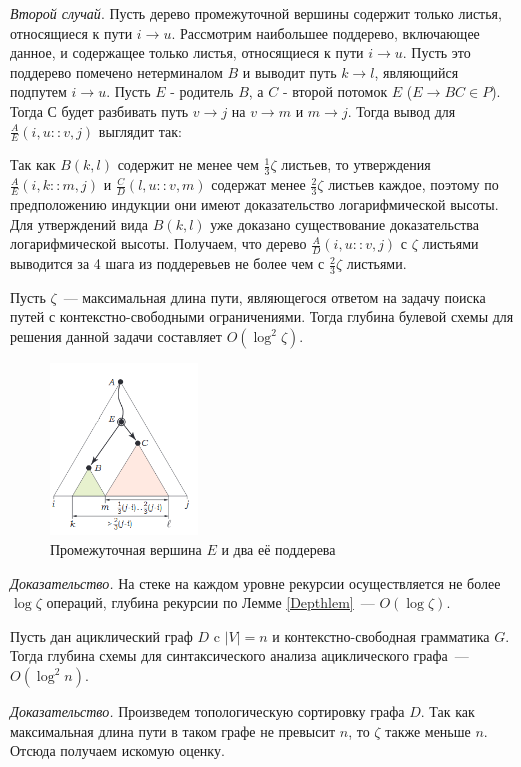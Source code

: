 \textit{Второй случай}. Пусть дерево промежуточной вершины содержит только листья, относящиеся к пути $i \rightarrow u$. Рассмотрим наибольшее поддерево, включающее данное, и содержащее только листья, относящиеся к пути $i \rightarrow u$. Пусть это поддерево помечено нетерминалом $B$ и выводит путь $k \rightarrow l$, являющийся подпутем $i \rightarrow u$. Пусть $E$ - родитель $B$, а $C$ - второй потомок $E$ ($E \rightarrow BC \in P$). Тогда $С$ будет разбивать путь $v \rightarrow j$ на $v \rightarrow m$ и $m \rightarrow j$. Тогда вывод для $\frac{A}{E}(i , u :: v , j)$ выглядит так:
\begin{prooftree}

\end{prooftree}
Так как $B(k, l)$ содержит не менее чем $\frac{1}{3}\zeta$ листьев, то утверждения $\frac{A}{E}(i , k :: m , j)$ и $\frac{C}{D}(l , u :: v , m)$ содержат менее $\frac{2}{3}\zeta$ листьев каждое, поэтому по предположению индукции они имеют доказательство логарифмической высоты. Для утверждений вида $B(k, l)$ уже доказано существование доказательства логарифмической высоты. Получаем, что дерево $\frac{A}{D}(i , u :: v , j)$ с $\zeta$ листьями выводится за 4 шага из поддеревьев не более чем с $\frac{2}{3}\zeta$ листьями.
\begin{lemmarus}\label{Depthzeta}
Пусть $\zeta$~--- максимальная длина пути, являющегося ответом на задачу поиска путей с контекстно-свободными ограничениями. Тогда глубина булевой схемы для решения данной задачи составляет $O(\log^2 \zeta)$.
\end{lemmarus}
\begin{figure}[!]
\centering
\includegraphics[width=0.35\textwidth]{Shemetova/e.png}
\caption{Промежуточная вершина $E$ и два её поддерева}
\label{e}
\end{figure}
\textit{Доказательство.} На стеке на каждом уровне рекурсии осуществляется не более $\log \zeta$ операций, глубина рекурсии по Лемме \ref{Depthlem}~--- $O(\log \zeta)$.
\begin{corollaryrus} Пусть дан ациклический граф $D$ c $|V|=n$ и контекстно-свободная грамматика $G$. Тогда глубина схемы для синтаксического анализа ациклического графа~--- $O(\log^2 n)$.
\end{corollaryrus}
\textit{Доказательство.} Произведем топологическую сортировку графа $D$. Так как максимальная длина пути в таком графе не превысит $n$, то $\zeta$ также меньше $n$. Отсюда получаем искомую оценку.

